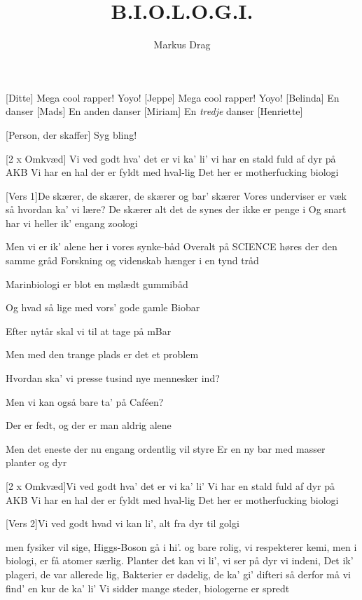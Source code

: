 \documentclass[a4paper,11pt]{article}
\title{B.I.O.L.O.G.I.}
\author{Markus Drag}
\begin{document}
\maketitle

\begin{roles}
    [Ditte] Mega cool rapper! Yoyo!
    [Jeppe] Mega cool rapper! Yoyo!
    [Belinda] En danser
    [Mads] En anden danser
    [Miriam] En \emph{tredje} danser
    [Henriette]
\end{roles}

\begin{props}
    [Person, der skaffer] Syg bling!
\end{props}

\begin{song}

[2 x Omkvæd]
Vi ved godt hva’ det er vi ka' li'
vi har en stald fuld af dyr på AKB
Vi har en hal der er fyldt med hval-lig
Det her er motherfucking biologi

[Vers 1]De skærer, de skærer, de skærer og bar' skærer
Vores underviser er væk så hvordan ka' vi lære?
De skærer alt det de synes der ikke er penge i
Og snart har vi heller ik' engang zoologi

Men vi er ik' alene her i vores synke-båd
Overalt på SCIENCE høres der den samme gråd
Forskning og videnskab hænger i en tynd tråd

Marinbiologi er blot en mølædt gummibåd

Og hvad så lige med vors’ gode gamle Biobar

Efter nytår skal vi til at tage på mBar


Men med den trange plads er det et problem

Hvordan ska' vi presse tusind nye mennesker ind?

Men vi kan også bare ta’ på Caféen?

Der er fedt, og der er man aldrig alene

Men det eneste der nu engang ordentlig vil styre
Er en ny bar med masser planter og dyr

[2 x Omkvæd]Vi ved godt hva’ det er vi ka' li'
Vi har en stald fuld af dyr på AKB
Vi har en hal der er fyldt med hval-lig
Det her er motherfucking biologi

[Vers 2]Vi ved godt hvad vi kan li', alt fra dyr til golgi

men fysiker vil sige, Higgs-Boson gå i hi’.
og bare rolig, vi respekterer kemi, 
men i biologi, er få atomer særlig.
Planter det kan vi li', vi ser på dyr vi indeni, 
Det ik' plageri, de var allerede lig,
Bakterier er dødelig, de ka’ gi’ difteri
så derfor må vi find’ en kur de ka’ li’
Vi sidder mange steder, biologerne er spredt


\end{song}
\end{document}
